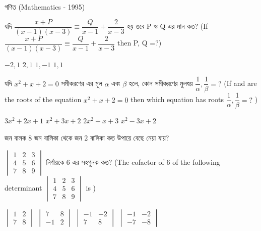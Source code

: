 \documentclass[addpoints]{exam}
\begin{document}
\begin{LARGE}
\begin{center}
গণিত (Mathematics - 1995)
\end{center}
\end{LARGE}
\begin{questions}

 \question  যদি $ \dfrac{x+P}{(x-1)(x-3)} \equiv \dfrac{Q}{x-1} + \dfrac{2}{x-3} $ হয় তবে P ও Q এর মান কত?  (If $ \dfrac{x+P}{(x-1)(x-3)} \equiv \dfrac{Q}{x-1} + \dfrac{2}{x-3} $ then P, Q =?)

\begin{oneparchoices}
\choice $ -2,1 $
\choice $ 2,1 $
\choice $ 1,-1 $
\choice $ 1,1 $
\end{oneparchoices}

\question যদি $ x^{2}+x+2=0 $ সমীকরণের এর মূল $ \alpha $ এবং $ \beta  $ হলে, কোন সমীকরণের মুলদ্বয় $ \dfrac{1}{\alpha},\dfrac{1}{\beta} = ?$ (If  and are the roots of the equation $ x^{2}+x+2=0 $ then which equation has roots $ \dfrac{1}{\alpha},\dfrac{1}{\beta} = ?$ )

\begin{oneparchoices}
\choice $ 3x^{2}+2x+1 $
\choice $ x^{2}+3x+2 $
\choice $ 2x^{2}+x+3 $
\choice $ x^{2}-3x+2 $
\end{oneparchoices}

 জন বালক 8 জন বালিকা থেকে জন 2 বালিকা কত উপায়ে বেছে নেয়া যায়?

\begin{oneparchoices}
\end{oneparchoices}

\question $ \begin{vmatrix}
1 & 2 & 3\\
4 & 5 & 6\\
7 & 8 & 9 
\end{vmatrix}  $  নির্ণায়কে 6 এর সহগুনক কত? (The cofactor of 6 of the following determinant $ \begin{vmatrix}
1 & 2 & 3\\
4 & 5 & 6\\
7 & 8 & 9 
\end{vmatrix}  $ is )

\begin{oneparchoices}
\choice $ \begin{vmatrix}
1 & 2\\
7 & 8
\end{vmatrix} $
\choice $ \begin{vmatrix}
7 & 8\\
-1 & 2
\end{vmatrix} $
\choice $ \begin{vmatrix}
-1 & -2\\
7 & 8
\end{vmatrix} $
\choice $ \begin{vmatrix}
-1 & -2\\
-7 & -8
\end{vmatrix} $
\end{oneparchoices}


\end{questions}
\end{document}
